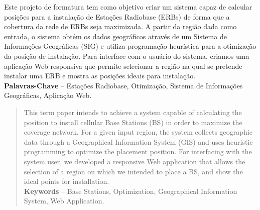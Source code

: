 \documentclass[]{politex}
\begin{document}
\begin{resumo}
Este projeto de formatura tem como objetivo criar um sistema capaz de calcular
posições para a instalação de Estações Radiobase (ERBs) de forma que a cobertura
da rede de ERBs seja maximizada. A partir da região dada como entrada, o sistema
obtém os dados geográficos através de um Sistema de Informações Geográficas
(SIG) e utiliza programação heurística para a otimização da posição de
instalação. Para interface com o usuário do sistema, criamos uma aplicação Web
responsiva que permite selecionar a região na qual se pretende instalar uma ERB
e mostra as posições ideais para instalação.
\\[3\baselineskip]
%
\textbf{Palavras-Chave} -- Estações Radiobase, Otimização, Sistema de
Informações Geográficas, Aplicação Web.
\end{resumo}


\begin{abstract}
This term paper intends to achieve a system capable of calculating the position
to install cellular Base Stations (BS) in order to maximize the coverage
network. For a given input region, the system collects geographic data through a
Geographical Information System (GIS) and uses heuristic programming to optimize
the placement position. For interfacing with the system user, we developed a
responsive Web application that allows the selection of a region on which we
intended to place a BS, and show the ideal points for installation.
\\[3\baselineskip]
%
\textbf{Keywords} -- Base Stations, Optimization, Geographical Information
System, Web Application.
\end{abstract}


\listadefiguras
\listadetabelas
\end{document}
